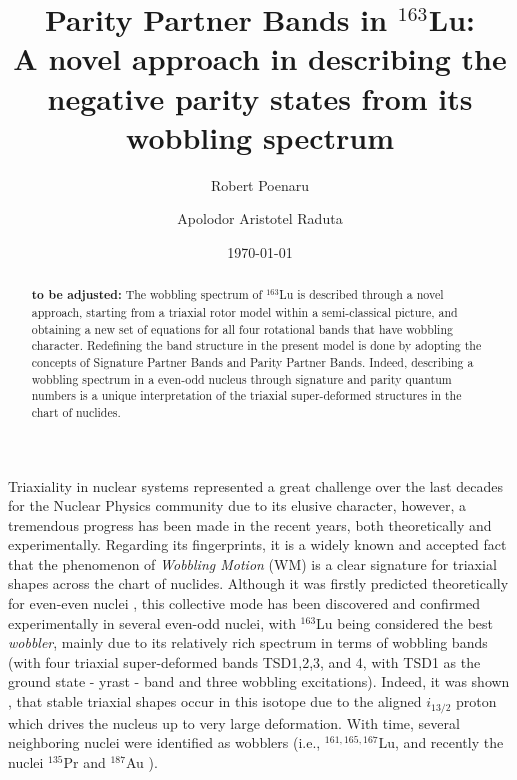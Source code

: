 \documentclass[%
 reprint,
 amsmath,
 amssymb,
 aps,
 floatfix,
]{revtex4-2}
\begin{document}
\title{Parity Partner Bands in $^{163}$Lu: \\ A novel approach in describing the negative parity states from its wobbling spectrum}%

\author{Robert Poenaru}%
\author{Apolodor Aristotel Raduta}%
%
%

\date{\today}

\begin{abstract}
\textbf{to be adjusted:} The wobbling spectrum of $^{163}$Lu is described through a novel approach, starting from a triaxial rotor model within a semi-classical picture, and obtaining a new set of equations for all four rotational bands that have wobbling character. Redefining the band structure in the present model is done by adopting the concepts of Signature Partner Bands and Parity Partner Bands. Indeed, describing a wobbling spectrum in a even-odd nucleus through signature and parity quantum numbers is a unique interpretation of the triaxial super-deformed structures in the chart of nuclides.
\end{abstract}

\maketitle



Triaxiality in nuclear systems represented a great challenge over the last decades for the Nuclear Physics community due to its elusive character, however, a tremendous progress has been made in the recent years, both theoretically and experimentally. Regarding its fingerprints, it is a widely known and accepted fact that the phenomenon of \emph{Wobbling Motion} (WM) is a clear signature for triaxial shapes across the chart of nuclides. Although it was firstly predicted theoretically for even-even nuclei \cite{bohr1998nuclear}, this collective mode has been discovered and confirmed experimentally in several even-odd nuclei, with $^{163}$Lu being considered the best \emph{wobbler}, mainly due to its relatively rich spectrum in terms of wobbling bands (with four triaxial super-deformed bands TSD1,2,3, and 4, with TSD1 as the ground state - yrast - band and three wobbling excitations). Indeed, it was shown \cite{odegaard2001evidence}, \cite{jensen2002wobbling} that stable triaxial shapes occur in this isotope due to the aligned $i_{13/2}$ proton which drives the nucleus up to very large deformation. With time, several neighboring nuclei were identified as wobblers (i.e., $^{161,165,167}$Lu, and recently the nuclei $^{135}$Pr \cite{matta2017transverse,sensharma2019two} and $^{187}$Au \cite{sensharma2020longitudinal}).
\end{document}
